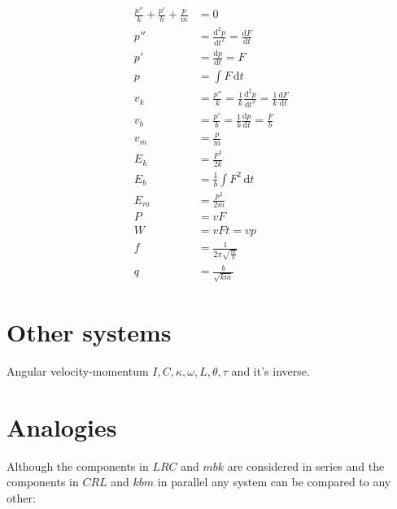 \documentclass[]{elementary-physics}
\begin{document}
\begin{subequations}
\begin{align}
\frac{p''}{k} + \frac{p'}{b} + \frac{p}{m} &= 0 \\
p'' &= \frac{\mathrm{d}^2 p}{\mathrm{d}t^2} = \frac{\mathrm{d}F}{\mathrm{d}t} \\
p' &= \frac{\mathrm{d}p}{\mathrm{d}t} = F \\
p &= \int F \, \mathrm{d}t \tag{definition of impulse} \\
v_k &= \frac{p''}{k} = \frac{1}{k} \frac{\mathrm{d}^2 p}{\mathrm{d}t^2} = \frac{1}{k} \frac{\mathrm{d}F}{\mathrm{d}t} \\
v_b &= \frac{p'}{b} = \frac{1}{b} \frac{\mathrm{d}p}{\mathrm{d}t} = \frac{F}{b} \\
v_m &= \frac{p}{m} \tag{definition of momentum} \\
E_k &= \frac{F^2}{2 k} \tag{energy in a spring} \\
E_b &= \frac{1}{b} \int F^2 \, \mathrm{d}t \tag{losses} \\
E_m &= \frac{p^2}{2 m} \tag{kinetic energy} \\
P &= v F \tag{power} \\
W &= v F t = v p \tag{work} \\
f &= \frac{1}{2 \pi \sqrt{\frac{m}{k}}} \tag{frequency} \\
q &= \frac{b}{\sqrt{k m}} \tag{quality factor}
\end{align}
\end{subequations}

\pagebreak

\section{Other systems}

Angular velocity-momentum $I,C,\kappa,\omega,L,\theta,\tau$ and it's inverse.

\section{Analogies}

Although the components in $LRC$ and $mbk$ are considered in series and the components in $CRL$ and $kbm$ in parallel any system can be compared to any other:
\end{document}

